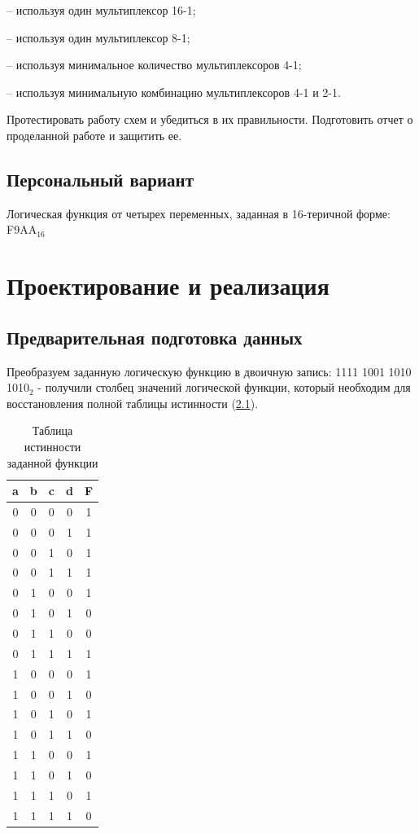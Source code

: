 \documentclass[14pt, a4paper]{extreport}
\begin{document}
– используя один мультиплексор 16-1;

– используя один мультиплексор 8-1;

– используя минимальное количество мультиплексоров 4-1;

– используя минимальную комбинацию мультиплексоров 4-1 и 2-1.

Протестировать работу схем и убедиться в их правильности. Подготовить отчет о проделанной работе и защитить ее.

\section{Персональный вариант}
Логическая функция от четырех переменных, заданная в 16-теричной форме: F9AA$_{16}$

\chapter{Проектирование и реализация}
\section{Предварительная подготовка данных}
Преобразуем заданную логическую функцию в двоичную запись: 1111 1001 1010 1010$_2$ - получили столбец значений логической функции, который необходим для восстановления полной таблицы истинности (\cref{tab:function-values}).

\begin{table}[!htbp]
	\caption{Таблица истинности заданной функции}
	\label{tab:function-values}
	\begin{tabular}{|c|c|c|c|c|}
		\hline
		a & b & c & d & F \\
		\hline
		0 & 0 & 0 & 0 & 1 \\
		\hline
		0 & 0 & 0 & 1 & 1 \\
		\hline
		0 & 0 & 1 & 0 & 1 \\
		\hline
		0 & 0 & 1 & 1 & 1 \\
		\hline
		0 & 1 & 0 & 0 & 1 \\
		\hline
		0 & 1 & 0 & 1 & 0 \\
		\hline
		0 & 1 & 1 & 0 & 0 \\
		\hline
		0 & 1 & 1 & 1 & 1 \\
		\hline
		1 & 0 & 0 & 0 & 1 \\
		\hline
		1 & 0 & 0 & 1 & 0 \\
		\hline
		1 & 0 & 1 & 0 & 1 \\
		\hline
		1 & 0 & 1 & 1 & 0 \\
		\hline
		1 & 1 & 0 & 0 & 1 \\
		\hline
		1 & 1 & 0 & 1 & 0 \\
		\hline
		1 & 1 & 1 & 0 & 1 \\
		\hline
		1 & 1 & 1 & 1 & 0 \\
		\hline
	\end{tabular}
\end{table}
\end{document}
